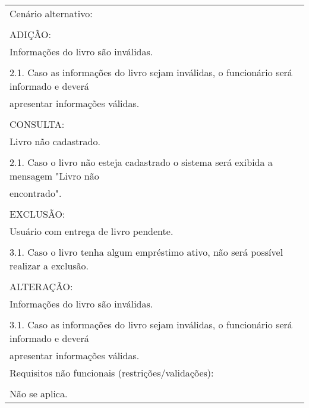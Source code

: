 \begin{longtable}{|l|}
Cenário alternativo:\\ \\ ADIÇÃO:\\ Informações do livro são inválidas.\\        \\ 2.1. Caso as informações do livro sejam inválidas, o funcionário será informado e deverá \\ apresentar informações válidas.\\ \\ CONSULTA:\\ Livro não cadastrado.\\ \\ 2.1. Caso o livro não esteja cadastrado o sistema será exibida a mensagem "Livro não\\ encontrado".\\ \\ EXCLUSÃO:\\ Usuário com entrega de livro pendente.\\ \\ 3.1. Caso o livro tenha algum empréstimo ativo, não será possível realizar a exclusão.\\ \\ ALTERAÇÃO:\\ Informações do livro são inválidas.\\ \\ 3.1. Caso as informações do livro sejam inválidas, o funcionário será informado e deverá\\ apresentar informações válidas.\\ \hline
Requisitos não funcionais (restrições/validações):\\ \\ Não se aplica.\\ \hline
\end{longtable}

